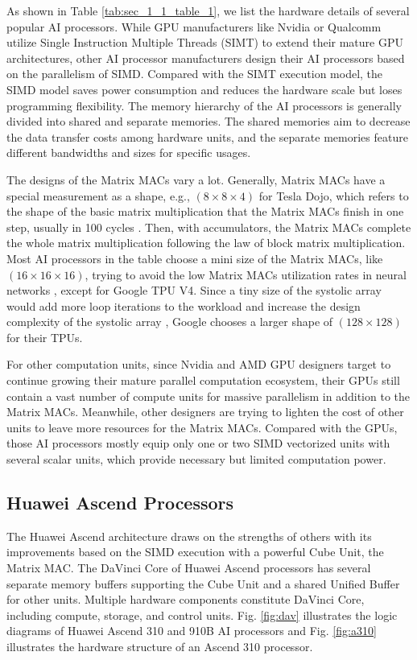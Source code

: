 \documentclass[12pt]{extbook}
\begin{document}
As shown in Table \ref{tab:sec_1_1_table_1}, we list the hardware details of several popular AI processors. While GPU manufacturers like Nvidia or Qualcomm utilize Single Instruction Multiple Threads (SIMT) to extend their mature GPU architectures, other AI processor manufacturers design their AI processors based on the parallelism of SIMD. Compared with the SIMT execution model, the SIMD model saves power consumption and reduces the hardware scale but loses programming flexibility. The memory hierarchy of the AI processors is generally divided into shared and separate memories. The shared memories aim to decrease the data transfer costs among hardware units, and the separate memories feature different bandwidths and sizes for specific usages. 

The designs of the Matrix MACs vary a lot. Generally, Matrix MACs have a special measurement as a shape, e.g., $(8 \times 8 \times 4)$ for Tesla Dojo, which refers to the shape of the basic matrix multiplication that the Matrix MACs finish in one step, usually in 100 cycles \cite{Mi300}. Then, with accumulators, the Matrix MACs complete the whole matrix multiplication following the law of block matrix multiplication. Most AI processors in the table choose a mini size of the Matrix MACs, like $(16 \times 16 \times 16)$, trying to avoid the low Matrix MACs utilization rates in neural networks \cite{DBLP:conf/hotchips/LiaoTXZ19}, except for Google TPU V4. Since a tiny size of the systolic array would add more loop iterations to the workload and increase the design complexity of the systolic array \cite{DBLP:journals/csur/XuMGL24}, Google chooses a larger shape of $(128 \times 128)$ for their TPUs. 

For other computation units, since Nvidia and AMD GPU designers target to continue growing their mature parallel computation ecosystem, their GPUs still contain a vast number of compute units for massive parallelism in addition to the Matrix MACs. Meanwhile, other designers are trying to lighten the cost of other units to leave more resources for the Matrix MACs. Compared with the GPUs, those AI processors mostly equip only one or two SIMD vectorized units with several scalar units, which provide necessary but limited computation power.

\subsection{Huawei Ascend Processors}
\label{Sec:1_1_2}

The Huawei Ascend architecture draws on the strengths of others with its improvements based on the SIMD execution with a powerful Cube Unit, the Matrix MAC. The DaVinci Core of Huawei Ascend processors has several separate memory buffers supporting the Cube Unit and a shared Unified Buffer for other units. Multiple hardware components constitute DaVinci Core, including compute, storage, and control units. Fig. \ref{fig:dav} illustrates the logic diagrams of Huawei Ascend 310 and 910B AI processors and Fig. \ref{fig:a310} illustrates the hardware structure of an Ascend 310 processor.
\end{document}

